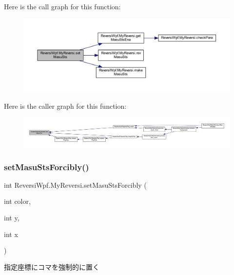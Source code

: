 Here is the call graph for this function\+:
\nopagebreak
\begin{figure}[H]
\begin{center}
\leavevmode
\includegraphics[width=350pt]{class_reversi_wpf_1_1_my_reversi_a03c7e639718936243e30302680c63f99_cgraph}
\end{center}
\end{figure}
Here is the caller graph for this function\+:
\nopagebreak
\begin{figure}[H]
\begin{center}
\leavevmode
\includegraphics[width=350pt]{class_reversi_wpf_1_1_my_reversi_a03c7e639718936243e30302680c63f99_icgraph}
\end{center}
\end{figure}
\mbox{\label{class_reversi_wpf_1_1_my_reversi_a6526ef12950147cd9900e0c2f8a33f1c}} 
\subsubsection{\texorpdfstring{set\+Masu\+Sts\+Forcibly()}{setMasuStsForcibly()}}
{\footnotesize\ttfamily int Reversi\+Wpf.\+My\+Reversi.\+set\+Masu\+Sts\+Forcibly (\begin{DoxyParamCaption}\item[{int}]{color,  }\item[{int}]{y,  }\item[{int}]{x }\end{DoxyParamCaption})}



指定座標にコマを強制的に置く 


